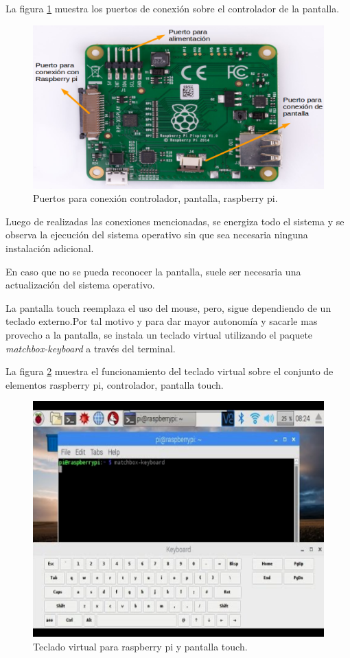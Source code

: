 La figura \ref{fig:controlador} muestra los puertos de conexión sobre el controlador de la pantalla.

\begin{figure}[H]
	\centering
	\includegraphics[scale =.25]{./Figures/controlador.png}
	\caption{Puertos para conexión controlador, pantalla, raspberry pi.}
	\label{fig:controlador}
\end{figure}

Luego de realizadas las conexiones mencionadas, se energiza todo el sistema y se observa la ejecución del sistema operativo sin que sea necesaria ninguna instalación adicional.
 
En caso que no se pueda reconocer la pantalla, suele ser necesaria una actualización del sistema operativo.

La pantalla touch reemplaza el uso del mouse, pero, sigue dependiendo de un teclado externo.Por tal motivo y para dar mayor autonomía y sacarle mas provecho a la pantalla, se instala un teclado virtual utilizando el paquete \textit{matchbox-keyboard} a través del terminal.

La figura \ref{fig:teclado} muestra el funcionamiento del teclado virtual sobre el conjunto de elementos raspberry pi, controlador, pantalla touch.

\begin{figure}[H]
	\centering
	\includegraphics[scale =.7]{./Figures/teclado.png}
	\caption{Teclado virtual para raspberry pi y pantalla touch.}
	\label{fig:teclado}
\end{figure}

